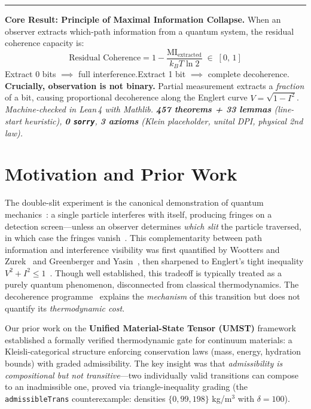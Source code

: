 \documentclass[10pt, a4paper]{article}
\newenvironment{leftbox}{%
  \par\vspace{0.3em}%
  \noindent\hspace{0pt}%
  \begin{minipage}[t]{3pt}\color{Black}\rule{3pt}{5.5\baselineskip}\end{minipage}%
  \hspace{8pt}%
  \begin{minipage}[t]{\dimexpr\textwidth-15pt}\small
}{%
  \end{minipage}\par\vspace{0.3em}%
}
\begin{document}
\begin{leftbox}
\textbf{Core Result: Principle of Maximal Information Collapse.}
When an observer extracts which-path information from a quantum system, the residual coherence capacity is:
\[
\text{Residual Coherence} = 1 - \frac{\text{MI}_{\text{extracted}}}{k_B T \ln 2} \;\in\; [0,\,1]
\]
Extract 0 bits $\implies$ full interference.\quad Extract 1 bit $\implies$ complete decoherence.\\[2pt]
\textbf{Crucially, observation is not binary.} Partial measurement extracts a \emph{fraction} of a bit, causing proportional decoherence along the Englert curve $V = \sqrt{1 - I^2}$.\\[2pt]
\textit{Machine-checked in Lean\,4 with Mathlib.\; \textbf{457 theorems + 33 lemmas} (line-start heuristic),\; \textbf{0 \texttt{sorry}},\; \textbf{3 axioms} (Klein placeholder, unital DPI, physical 2nd law).}
\end{leftbox}

\section{Motivation and Prior Work}

The double-slit experiment is the canonical demonstration of quantum mechanics~\cite{feynman1965, vonneumann1932}: a single particle interferes with itself, producing fringes on a detection screen---unless an observer determines \emph{which slit} the particle traversed, in which case the fringes vanish~\cite{bohr1928}. This complementarity between path information and interference visibility was first quantified by Wootters and Zurek~\cite{wootters1979} and Greenberger and Yasin~\cite{greenberger1988}, then sharpened to Englert's tight inequality $V^2 + I^2 \le 1$~\cite{englert1996}. Though well established, this tradeoff is typically treated as a purely quantum phenomenon, disconnected from classical thermodynamics. The decoherence programme~\cite{zurek2003, schlosshauer2005} explains the \emph{mechanism} of this transition but does not quantify its \emph{thermodynamic cost}.

Our prior work on the \textbf{Unified Material-State Tensor (UMST)} framework~\cite{umst-formal, fcpI, fcpII} established a formally verified thermodynamic gate for continuum materials: a Kleisli-categorical structure enforcing conservation laws (mass, energy, hydration bounds) with graded admissibility. The key insight was that \emph{admissibility is compositional but not transitive}---two individually valid transitions can compose to an inadmissible one, proved via triangle-inequality grading (the \texttt{admissibleTrans} counterexample: densities $\{0, 99, 198\}$ kg/m$^3$ with $\delta = 100$).
\end{document}
